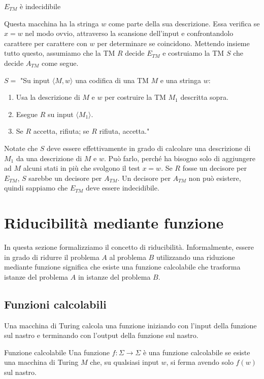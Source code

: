 \begin{Thm}{$E_{TM}$ è indecidibile}{}
\begin{demonstration}
Questa macchina ha la stringa $w$ come parte della sua descrizione. Essa verifica se $x = w$ nel modo ovvio, attraverso la scansione dell'input e confrontandolo carattere per carattere con $w$ per determinare se coincidono. Mettendo insieme tutto questo, assumiamo che la TM $R$ decide $E_{TM}$ e costruiamo la TM $S$ che decide $A_{TM}$ come segue.

$S =$ "Su input $\langle M, w\rangle$ una codifica di una TM $M$ e una stringa $w$:
\begin{enumerate}
    \item Usa la descrizione di $M$ e $w$ per costruire la TM $M_{1}$ descritta sopra.
    \item Esegue $R$ su input $\langle M_{1}\rangle$.
    \item Se $R$ accetta, rifiuta; se $R$ rifiuta, accetta."
\end{enumerate}

Notate che $S$ deve essere effettivamente in grado di calcolare una descrizione di $M_{1}$ da una descrizione di $M$ e $w$. Può farlo, perché ha bisogno solo di aggiungere ad $M$ alcuni stati in più che svolgono il test $x = w$. Se $R$ fosse un decisore per $E_{TM}$, $S$ sarebbe un decisore per $A_{TM}$. Un decisore per $A_{TM}$ non può esistere, quindi sappiamo che $E_{TM}$ deve essere indecidibile.
\end{demonstration}
\end{Thm}

\section{Riducibilità mediante funzione}
In questa sezione formalizziamo il concetto di riducibilità. Informalmente, essere in grado di ridurre il problema $A$ al problema $B$ utilizzando una riduzione mediante funzione significa che esiste una funzione calcolabile che trasforma istanze del problema $A$ in istanze del problema $B$.

\subsection{Funzioni calcolabili}
Una macchina di Turing calcola una funzione iniziando con l'input della funzione sul nastro e terminando con l'output della funzione sul nastro.

\begin{Definition}{Funzione calcolabile}{}
Una funzione $f: \Sigma\rightarrow\Sigma$ è una funzione calcolabile se esiste una macchina di Turing $M$ che, su qualsiasi input $w$, si ferma avendo solo $f(w)$ sul nastro.
\end{Definition}

